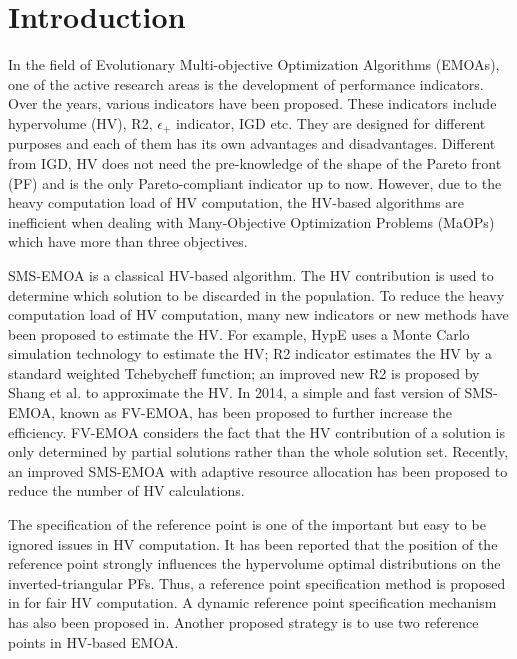 \documentclass[conference]{IEEEtran}
\begin{document}
\section{Introduction}
In the field of Evolutionary Multi-objective Optimization Algorithms (EMOAs), 
one of the active research areas is the development of performance indicators. 
Over the years, various indicators have been proposed. 
These indicators include hypervolume (HV)\cite{hypervolume}, 
R2\cite{R2}, $\epsilon_+$ indicator\cite{e+}, IGD\cite{IGD} etc.
They are designed for different purposes and each of them has its own advantages and disadvantages.
Different from IGD, 
HV does not need the pre-knowledge of the shape of the Pareto front (PF) 
and is the only Pareto-compliant indicator up to now\cite{pareto_compliant}. 
However, due to the heavy computation load of HV computation\cite{hypervolume:computationLoad}, 
the HV-based algorithms are inefficient when dealing with Many-Objective Optimization Problems (MaOPs) which have more than three objectives. 

SMS-EMOA\cite{smsemoa} is a classical HV-based algorithm. 
The HV contribution is used to determine which solution to be discarded in the population. 
To reduce the heavy computation load of HV computation, 
many new indicators or new methods have been proposed to estimate the HV. 
For example, HypE uses a Monte Carlo simulation technology to estimate the HV\cite{HypE}; 
R2 indicator estimates the HV by a standard weighted Tchebycheff function\cite{R2}; 
an improved new R2 is proposed by Shang et al.\cite{newR2} to approximate the HV.  
In 2014, a simple and fast version of SMS-EMOA, known as FV-EMOA, has been proposed\cite{FVEMOA}
to further increase the efficiency.
FV-EMOA considers the fact that 
the HV contribution of a solution is only determined by partial solutions rather than the whole solution set\cite{FVEMOA}. 
Recently, an improved SMS-EMOA with adaptive resource allocation has been proposed to reduce the number of HV calculations\cite{ismsemoa}. 

The specification of the reference point is one of the important but easy to be ignored issues in HV computation.  
It has been reported that the position of the reference point strongly influences the hypervolume optimal distributions 
on the inverted-triangular PFs\cite{hisao:RPhowtoSpecify, hisao:RPspecify, hisao:RPexplanation}. 
Thus, a reference point specification method is proposed in \cite{hisao:RPspecify} for fair HV computation.
A dynamic reference point specification mechanism has also been proposed in\cite{hisao:dynamic}.
Another proposed strategy is to use two reference points in HV-based EMOA\cite{hisao:twoRP}. 
\end{document}
